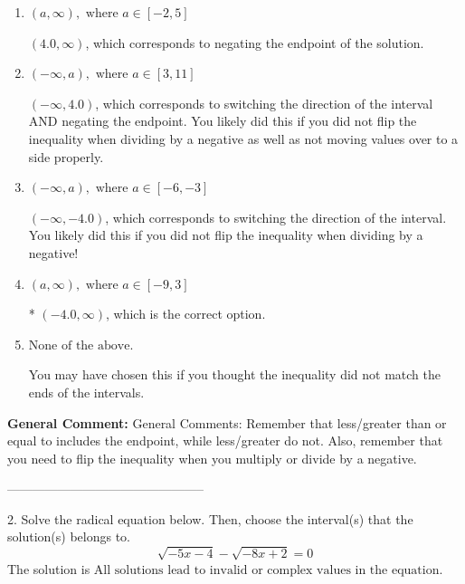 \documentclass{extbook}[14pt]
\begin{document}
\begin{enumerate}[label=\Alph*.] 
\item $ (a, \infty), \text{ where } a \in [-2, 5] $ 

  $(4.0, \infty)$, which corresponds to negating the endpoint of the solution. 
\item $ (-\infty, a), \text{ where } a \in [3, 11] $ 

  $(-\infty, 4.0)$, which corresponds to switching the direction of the interval AND negating the endpoint. You likely did this if you did not flip the inequality when dividing by a negative as well as not moving values over to a side properly. 
\item $ (-\infty, a), \text{ where } a \in [-6, -3] $ 

  $(-\infty, -4.0)$, which corresponds to switching the direction of the interval. You likely did this if you did not flip the inequality when dividing by a negative! 
\item $ (a, \infty), \text{ where } a \in [-9, 3] $ 

 * $(-4.0, \infty)$, which is the correct option. 
\item $ \text{None of the above}. $ 

 You may have chosen this if you thought the inequality did not match the ends of the intervals. 
\end{enumerate} 
 
\textbf{General Comment:} General Comments: Remember that less/greater than or equal to includes the endpoint, while less/greater do not. Also, remember that you need to flip the inequality when you multiply or divide by a negative. 

-----------------------------------------------

2. Solve the radical equation below. Then, choose the interval(s) that the solution(s) belongs to.
\[ \sqrt{-5 x - 4} - \sqrt{-8 x + 2} = 0 \] 
The solution is $ \text{All solutions lead to invalid or complex values in the equation.} $ 
\end{document}
